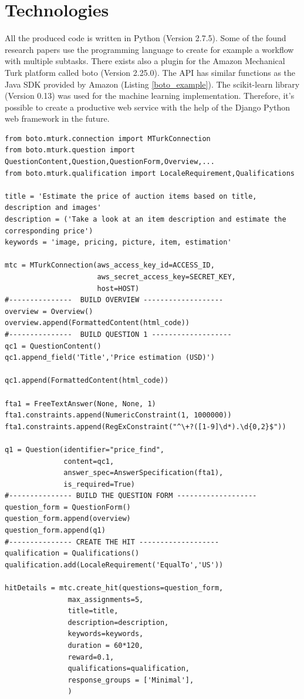 \section{Technologies}
All the produced code is written in Python (Version 2.7.5). Some of the found research papers use the programming language to create for example a workflow with multiple subtasks. There exists also a plugin for the Amazon Mechanical Turk platform called boto (Version 2.25.0). The API has similar functions as the Java SDK provided by Amazon (Listing \ref{boto_example}). The scikit-learn library (Version 0.13) was used for the machine learning implementation. Therefore, it's possible to create a productive web service with the help of the Django Python web framework in the future.
\begin{lstlisting}
from boto.mturk.connection import MTurkConnection
from boto.mturk.question import QuestionContent,Question,QuestionForm,Overview,...
from boto.mturk.qualification import LocaleRequirement,Qualifications

title = 'Estimate the price of auction items based on title, description and images'
description = ('Take a look at an item description and estimate the corresponding price')
keywords = 'image, pricing, picture, item, estimation'

mtc = MTurkConnection(aws_access_key_id=ACCESS_ID,
                      aws_secret_access_key=SECRET_KEY,
                      host=HOST)
#---------------  BUILD OVERVIEW -------------------
overview = Overview()
overview.append(FormattedContent(html_code))
#---------------  BUILD QUESTION 1 -------------------
qc1 = QuestionContent()
qc1.append_field('Title','Price estimation (USD)')
 
qc1.append(FormattedContent(html_code))
 
fta1 = FreeTextAnswer(None, None, 1)
fta1.constraints.append(NumericConstraint(1, 1000000))          
fta1.constraints.append(RegExConstraint("^\+?([1-9]\d*).\d{0,2}$"))
 
q1 = Question(identifier="price_find",
              content=qc1,
              answer_spec=AnswerSpecification(fta1),
              is_required=True)
#--------------- BUILD THE QUESTION FORM -------------------
question_form = QuestionForm()
question_form.append(overview)
question_form.append(q1)
#--------------- CREATE THE HIT -------------------
qualification = Qualifications()
qualification.add(LocaleRequirement('EqualTo','US'))

hitDetails = mtc.create_hit(questions=question_form,
               max_assignments=5,
               title=title,
               description=description,
               keywords=keywords,
               duration = 60*120,
               reward=0.1,
               qualifications=qualification,
               response_groups = ['Minimal'],
               ) 
\end{lstlisting}

